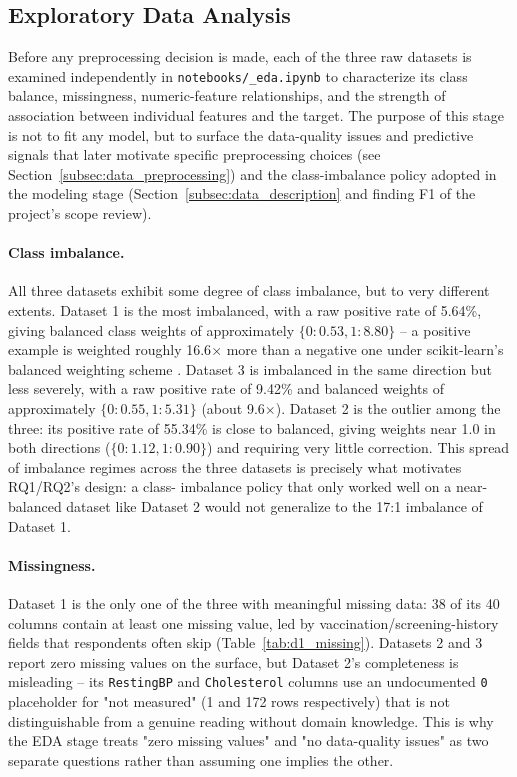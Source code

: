 \subsection{Exploratory Data Analysis}
\label{subsec:data_eda}

\begin{sloppypar}

Before any preprocessing decision is made, each of the three raw datasets is
examined independently in \texttt{notebooks/\_eda.\allowbreak ipynb} to characterize its
class balance, missingness, numeric-feature relationships, and the strength of
association between individual features and the target. The purpose of this
stage is not to fit any model, but to surface the data-quality issues and
predictive signals that later motivate specific preprocessing choices (see
Section~\ref{subsec:data_preprocessing}) and the class-imbalance policy adopted
in the modeling stage (Section~\ref{subsec:data_description} and finding F1 of
the project's scope review).

\paragraph{Class imbalance.} All three datasets exhibit some degree of class
imbalance, but to very different extents. Dataset 1 is the most imbalanced,
with a raw positive rate of 5.64\%, giving balanced class weights of
approximately $\{0: 0.53, 1: 8.80\}$ -- a positive example is weighted roughly
16.6$\times$ more than a negative one under scikit-learn's balanced weighting
scheme \cite{pedregosa2011scikit}. Dataset 3 is imbalanced in the same
direction but less severely, with a raw positive rate of 9.42\% and balanced
weights of approximately $\{0: 0.55, 1: 5.31\}$ (about 9.6$\times$). Dataset 2
is the outlier among the three: its positive rate of 55.34\% is close to
balanced, giving weights near 1.0 in both directions ($\{0: 1.12, 1: 0.90\}$)
and requiring very little correction. This spread of imbalance regimes across
the three datasets is precisely what motivates RQ1/RQ2's design: a class-
imbalance policy that only worked well on a near-balanced dataset like Dataset
2 would not generalize to the 17:1 imbalance of Dataset 1.

\paragraph{Missingness.} Dataset 1 is the only one of the three with
meaningful missing data: 38 of its 40 columns contain at least one missing
value, led by vaccination/screening-history fields that respondents often
skip (Table~\ref{tab:d1_missing}). Datasets 2 and 3 report zero missing values
on the surface, but Dataset 2's completeness is misleading -- its
\texttt{RestingBP} and \texttt{Cholesterol} columns use an undocumented
\texttt{0} placeholder for "not measured" (1 and 172 rows respectively) that
is not distinguishable from a genuine reading without domain knowledge. This
is why the EDA stage treats "zero missing values" and "no data-quality
issues" as two separate questions rather than assuming one implies the other.


\end{sloppypar}
